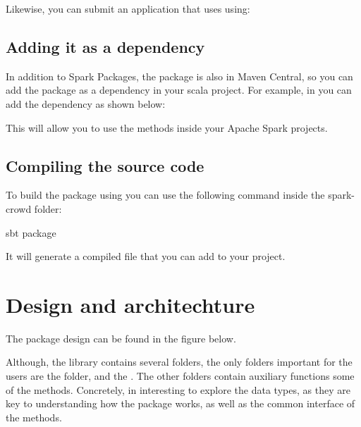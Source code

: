 \documentclass[letterpaper,10pt,english]{sphinxmanual}
\begin{document}
Likewise, you can submit an application that uses  using:


\section{Adding it as a dependency}
\label{\detokenize{usage/installation:adding-it-as-a-dependency}}
In addition to Spark Packages, the package is also in Maven Central, so you can add the package as a dependency in your scala project.
For example, in  you can add the dependency as shown below:

%
\begin{sphinxVerbatim}[commandchars=\\\{\}]
      
\end{sphinxVerbatim}

This will allow you to use the methods inside your Apache Spark projects.


\section{Compiling the source code}
\label{\detokenize{usage/installation:compiling-the-source-code}}
To build the package using  you can use the following command inside the spark-crowd folder:

%
\begin{sphinxVerbatim}[commandchars=\\\{\}]
sbt package
\end{sphinxVerbatim}

It will generate a compiled  file that you can add to your project.


\chapter{Design and architechture}
\label{\detokenize{package/design:design-and-architechture}}\label{\detokenize{package/design::doc}}
The package design can be found in the figure below.

\noindent{}

Although, the library contains several folders, the only folders important for the users
are the  folder, and the . The other folders contain auxiliary
functions some of the methods. Concretely, in interesting to explore the data types, as
they are key to understanding how the package works, as well as the common interface of
the methods.
\end{document}
